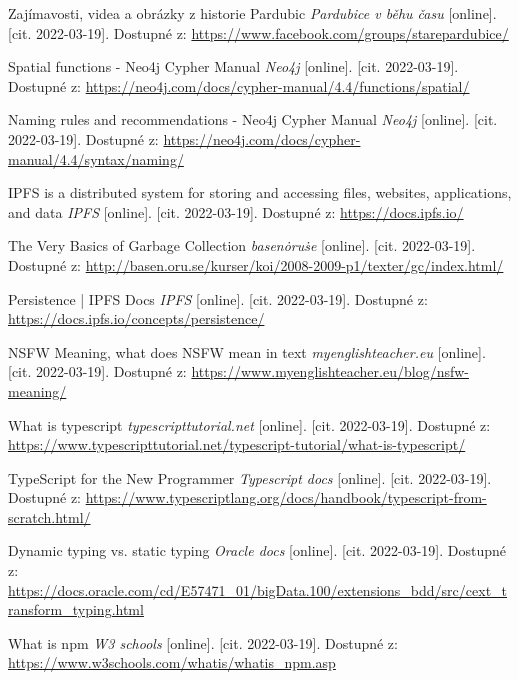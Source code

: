 \begin{thebibliography}{55}
    Zajímavosti, videa a obrázky z historie Pardubic \textit{Pardubice v běhu času} [online]. [cit. 2022-03-19]. Dostupné z: \url{https://www.facebook.com/groups/starepardubice/}

    Spatial functions - Neo4j Cypher Manual \textit{Neo4j} [online]. [cit. 2022-03-19]. Dostupné z: \url{https://neo4j.com/docs/cypher-manual/4.4/functions/spatial/}
    
    Naming rules and recommendations - Neo4j Cypher Manual \textit{Neo4j} [online]. [cit. 2022-03-19]. Dostupné z: \url{https://neo4j.com/docs/cypher-manual/4.4/syntax/naming/}
    
    IPFS is a distributed system for storing and accessing files, websites, applications, and data \textit{IPFS} [online]. [cit. 2022-03-19]. Dostupné z: \url{https://docs.ipfs.io/}
    
    The Very Basics of Garbage Collection \textit{basen\.oru\.se} [online]. [cit. 2022-03-19]. Dostupné z: \url{http://basen.oru.se/kurser/koi/2008-2009-p1/texter/gc/index.html/}
    
    Persistence | IPFS Docs \textit{IPFS} [online]. [cit. 2022-03-19]. Dostupné z: \url{https://docs.ipfs.io/concepts/persistence/}

    NSFW Meaning, what does NSFW mean in text \textit{myenglishteacher.eu} [online]. [cit. 2022-03-19]. Dostupné z: \url{https://www.myenglishteacher.eu/blog/nsfw-meaning/}
    
    What is typescript \textit{typescripttutorial.net} [online]. [cit. 2022-03-19]. Dostupné z: \url{https://www.typescripttutorial.net/typescript-tutorial/what-is-typescript/}
    
    TypeScript for the New Programmer \textit{Typescript docs} [online]. [cit. 2022-03-19]. Dostupné z: \url{https://www.typescriptlang.org/docs/handbook/typescript-from-scratch.html/}
    
    Dynamic typing vs. static typing \textit{Oracle docs} [online]. [cit. 2022-03-19]. Dostupné z: \url{https://docs.oracle.com/cd/E57471_01/bigData.100/extensions_bdd/src/cext_transform_typing.html}
    
    What is npm \textit{W3 schools} [online]. [cit. 2022-03-19]. Dostupné z: \url{https://www.w3schools.com/whatis/whatis_npm.asp}


\end{thebibliography}
